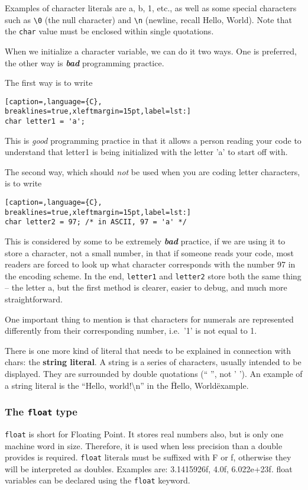 Examples of character literals are a, b, 1, etc., as well as some special
characters such as \texttt{\textbackslash{}0} (the null character) and
\texttt{\textbackslash{}n} (newline, recall Hello, World). Note that the
\texttt{char} value must be enclosed within single quotations.

When we initialize a character variable, we can do it two ways. One is
preferred, the other way is \textbf{\emph{bad}} programming practice.

The first way is to write
\lstset{basicstyle=\scriptsize, numbers=left, captionpos=b, tabsize=4}
\begin{lstlisting}[caption=,language={C},
breaklines=true,xleftmargin=15pt,label=lst:]
char letter1 = 'a';
\end{lstlisting}

This is \emph{good} programming practice in that it allows a person reading
your code to understand that letter1 is being initialized with the letter 'a'
to start off with.

The second way, which should \emph{not} be used when you are coding letter
characters, is to write
\lstset{basicstyle=\scriptsize, numbers=left, captionpos=b, tabsize=4}
\begin{lstlisting}[caption=,language={C},
breaklines=true,xleftmargin=15pt,label=lst:]
char letter2 = 97; /* in ASCII, 97 = 'a' */
\end{lstlisting}

This is considered by some to be extremely \textbf{\emph{bad}} practice, if we
are using it to store a character, not a small number, in that if someone reads
your code, most readers are forced to look up what character corresponds with
the number 97 in the encoding scheme. In the end, \texttt{letter1} and
\texttt{letter2} store both the same thing -- the letter a, but the first
method is clearer, easier to debug, and much more straightforward. 

One important thing to mention is that characters for numerals are represented
differently from their corresponding number, i.e.\ '1' is not equal to 1. 

There is one more kind of literal that needs to be explained in connection with
chars: the \textbf{string literal}. A string is a series of characters, usually
intended to be displayed. They are surrounded by double quotations (`` '', not
' '). An example of a string literal is the ``Hello, world!\textbackslash{}n''
in the \"Hello, World\" example.

\subsubsection{The \texttt{float} type}
\texttt{float} is short for Floating Point. It stores real numbers also, but is
only one machine word in size. Therefore, it is used when less precision than a
double provides is required. \texttt{float} literals must be suffixed with F or
f, otherwise they will be interpreted as doubles. Examples are: 3.1415926f,
4.0f, 6.022e+23f. float variables can be declared using the \texttt{float}
keyword.

